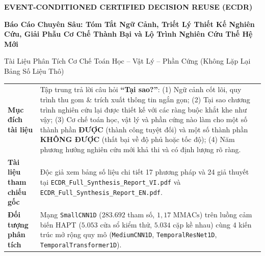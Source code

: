 \documentclass[11pt,a4paper]{article}
\newcommand{\code}[1]{{\small\ttfamily\nolinkurl{#1}}}
\begin{document}
\hypersetup{pageanchor=false}
\begin{titlepage}
\vspace*{0.4cm}
{\Large\bfseries\color{teal} EVENT-CONDITIONED CERTIFIED DECISION REUSE (ECDR)\par}
\vspace{0.35cm}
{\huge\bfseries\color{ink} Báo Cáo Chuyên Sâu: Tóm Tắt Ngữ Cảnh, Triết Lý Thiết Kế Nghiên Cứu, Giải Phẫu Cơ Chế Thành Bại và Lộ Trình Nghiên Cứu Thế Hệ Mới\par}
\vspace{0.45cm}
{\large\color{ink} Tài Liệu Phân Tích Cơ Chế Toán Học -- Vật Lý -- Phần Cứng (Không Lặp Lại Bảng Số Liệu Thô)\par}
\vspace{0.55cm}

\begin{tabularx}{\linewidth}{@{}P{4.0cm}Y@{}}
\toprule
\textbf{Mục đích tài liệu} & Tập trung trả lời câu hỏi \textbf{``Tại sao?''}: (1) Ngữ cảnh cốt lõi, quy trình thu gom \& trích xuất thông tin ngắn gọn; (2) Tại sao chương trình nghiên cứu lại được thiết kế với các ràng buộc khắt khe như vậy; (3) Cơ chế toán học, vật lý và phần cứng nào làm cho một số thành phần \textbf{ĐƯỢC} (thành công tuyệt đối) và một số thành phần \textbf{KHÔNG ĐƯỢC} (thất bại về độ phủ hoặc tốc độ); (4) Năm phương hướng nghiên cứu mới khả thi và có định lượng rõ ràng.\\
\textbf{Tài liệu tham chiếu gốc} & Độc giả xem bảng số liệu chi tiết 17 phương pháp và 24 giả thuyết tại \code{ECDR\_Full\_Synthesis\_Report\_VI.pdf} và \code{ECDR\_Full\_Synthesis\_Report\_EN.pdf}.\\
\textbf{Đối tượng phân tích} & Mạng \code{SmallCNN1D} ($283.692$ tham số, $1,17\text{ MMACs}$) trên luồng cảm biến HAPT ($5.053$ cửa sổ kiểm thử, $5.034$ cặp kề nhau) cùng 4 kiến trúc mở rộng quy mô (\code{MediumCNN1D}, \code{TemporalResNet1D}, \code{TemporalTransformer1D}).\\
\bottomrule
\end{tabularx}


\end{titlepage}
\end{document}
